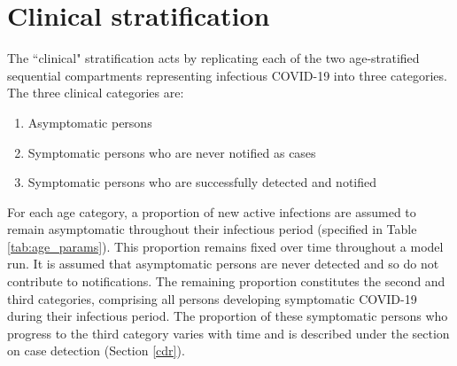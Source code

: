 \section{Clinical stratification} \label{clin}
The ``clinical" stratification acts by replicating each of the two age-stratified sequential compartments representing infectious COVID-19 into three categories.
The three clinical categories are:
\begin{enumerate}
    \item Asymptomatic persons
    \item Symptomatic persons who are never notified as cases
    \item Symptomatic persons who are successfully detected and notified
\end{enumerate}
For each age category, a proportion of new active infections are assumed to remain asymptomatic throughout their infectious period (specified in Table \ref{tab:age_params}).
This proportion remains fixed over time throughout a model run.
It is assumed that asymptomatic persons are never detected and so do not contribute to notifications.
The remaining proportion constitutes the second and third categories, comprising all persons developing symptomatic COVID-19 during their infectious period.
The proportion of these symptomatic persons who progress to the third category varies with time and is described under the section on case detection (Section \ref{cdr}).